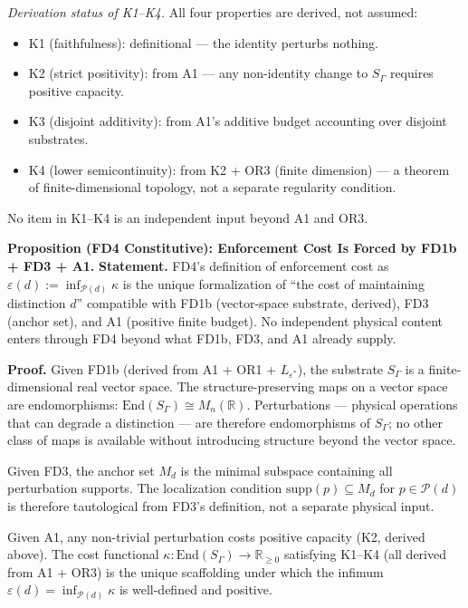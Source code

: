 \documentclass[11pt]{article}
\theoremstyle{remark}
\begin{document}
\smallskip\noindent\textit{Derivation status of K1--K4.}  All four properties are derived, not assumed:
\begin{itemize}[nosep,leftmargin=2em,itemsep=1pt]
\item K1 (faithfulness): definitional --- the identity perturbs nothing.
\item K2 (strict positivity): from A1 --- any non-identity change to $S_\Gamma$ requires positive capacity.
\item K3 (disjoint additivity): from A1's additive budget accounting over disjoint substrates.
\item K4 (lower semicontinuity): from K2 + OR3 (finite dimension) --- a theorem of finite-dimensional topology, not a separate regularity condition.
\end{itemize}
No item in K1--K4 is an independent input beyond A1 and OR3.


\medskip\noindent\textbf{Proposition (FD4 Constitutive): Enforcement Cost Is Forced by FD1b + FD3 + A1.}
\label{prop:FD4_constitutive}
\textbf{Statement.}  FD4's definition of enforcement cost as $\varepsilon(d) := \inf_{\mathcal{P}(d)} \kappa$ is the unique formalization of ``the cost of maintaining distinction $d$'' compatible with FD1b (vector-space substrate, derived), FD3 (anchor set), and A1 (positive finite budget).  No independent physical content enters through FD4 beyond what FD1b, FD3, and A1 already supply.

\smallskip\noindent\textbf{Proof.}  Given FD1b (derived from A1 + OR1 + $L_{\varepsilon^*}$), the substrate $S_\Gamma$ is a finite-dimensional real vector space.  The structure-preserving maps on a vector space are endomorphisms: $\mathrm{End}(S_\Gamma) \cong M_n(\mathbb{R})$.  Perturbations --- physical operations that can degrade a distinction --- are therefore endomorphisms of $S_\Gamma$; no other class of maps is available without introducing structure beyond the vector space.

Given FD3, the anchor set $M_d$ is the minimal subspace containing all perturbation supports.  The localization condition $\mathrm{supp}(p) \subseteq M_d$ for $p \in \mathcal{P}(d)$ is therefore tautological from FD3's definition, not a separate physical input.

Given A1, any non-trivial perturbation costs positive capacity (K2, derived above).  The cost functional $\kappa: \mathrm{End}(S_\Gamma) \to \mathbb{R}_{\ge 0}$ satisfying K1--K4 (all derived from A1 + OR3) is the unique scaffolding under which the infimum $\varepsilon(d) = \inf_{\mathcal{P}(d)} \kappa$ is well-defined and positive.
\end{document}
